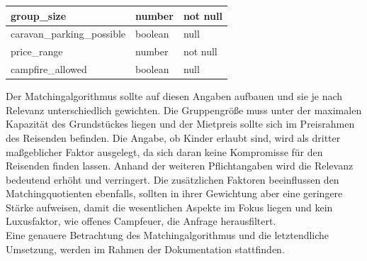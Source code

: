 \begin{table}[H]
\begin{tabular}{|l|l|l|}
group\_size                                                          & number                                 & not null                                  \\ \hline
caravan\_parking\_possible  										 & boolean                                & null                                      \\ \hline
price\_range                                                         & number                                 & not null                                  \\ \hline
campfire\_allowed                                                    & boolean                                & null                                      \\ \hline
\end{tabular}
\label{tab:ausstattungsattribute}
\end{table}

Der Matchingalgorithmus sollte auf diesen Angaben aufbauen und sie je nach Relevanz unterschiedlich gewichten.
Die Gruppengröße muss unter der maximalen Kapazität des Grundstückes liegen und der Mietpreis sollte sich im Preisrahmen des Reisenden befinden. 
Die Angabe, ob Kinder erlaubt sind, wird als dritter maßgeblicher Faktor ausgelegt, da sich daran keine Kompromisse für den Reisenden finden lassen.
Anhand der weiteren Pflichtangaben wird die Relevanz bedeutend erhöht und verringert. Die zusätzlichen Faktoren beeinflussen den Matchingquotienten ebenfalls, sollten in ihrer Gewichtung aber eine geringere Stärke aufweisen, damit die wesentlichen Aspekte im Fokus liegen und kein Luxusfaktor, wie offenes Campfeuer, die Anfrage herausfiltert.\\

Eine genauere Betrachtung des Matchingalgorithmus und die letztendliche Umsetzung, werden im Rahmen der Dokumentation stattfinden.
